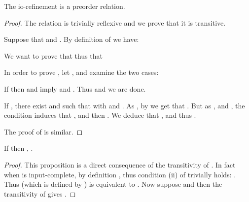 \documentclass{LMCS}
\theoremstyle{plain}\newtheorem{proposition}[thm]{Proposition}
\begin{document}
\begin{lem}
The io-refinement  is a preorder relation.
\end{lem}
\begin{proof}
The relation  is trivially reflexive and we prove that it is transitive.

Suppose that  and .
By definition of  we have:

We want to prove that  thus that

In order to  prove , 
let , and examine the two cases: 
\begin{iteMize}{}
\item If  then  and  
imply     and 
. Thus 
 and we are done.
\item If , 
there exist  
and  such that 
 with  
and   .
As , by  we get that . 
But as , and , 
the condition  induces that ,
and then .
We deduce that  ,  and thus
 .
\end{iteMize}
The proof of  is similar.
\end{proof}



\begin{prop}
\label{prop:tioco-alt-sim}
If  then  , 
.
\end{prop}
\begin{proof}


This proposition is a direct consequence of the transitivity of .
In fact when  is input-complete, by definition , thus condition (ii) of  
trivially holds:
.
Thus  (which is defined by ) is equivalent to .
Now suppose  and  then the transitivity of  gives .
\end{proof}
\end{document}
